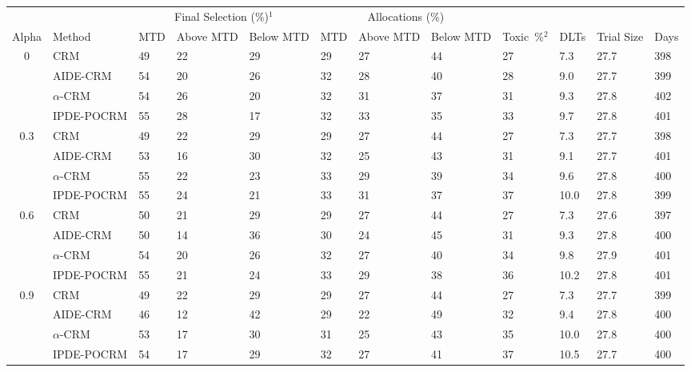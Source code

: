 \begin{tabular*}{\textwidth}{@{\extracolsep\fill}clllllllllll@{\extracolsep\fill}}
\toprule
&  & \multicolumn{3}{c}{Final Selection (\%)$^1$} & \multicolumn{3}{c}{Allocations (\%)} & &  &  &  \\
\multirow{2}{2em}{Alpha} & \multirow{2}{2em}{Method} & \multirow{2}{2em}{MTD} & \multirow{2}{2em}{Above MTD} & \multirow{2}{2em}{Below MTD} & \multirow{2}{2em}{MTD} & \multirow{2}{2em}{Above MTD} & \multirow{2}{2em}{Below MTD} & \multirow{2}{2em}{Toxic~\%$^2$} & \multirow{2}{2em}{DLTs} & \multirow{2}{2em}{Trial Size} & \multirow{2}{2em}{Days}  \\ \\ 
\midrule
\multirow{4}{2em}{0} & CRM & 49 & 22 & 29 & 29 & 27 & 44 & 27 & 7.3 & 27.7 & 398\\
 & AIDE-CRM & 54 & 20 & 26 & 32 & 28 & 40 & 28 & 9.0 & 27.7 & 399\\
 & $\alpha$-CRM & 54 & 26 & 20 & 32 & 31 & 37 & 31 & 9.3 & 27.8 & 402\\
 & IPDE-POCRM & 55 & 28 & 17 & 32 & 33 & 35 & 33 & 9.7 & 27.8 & 401\\
\midrule
\multirow{4}{2em}{0.3} & CRM & 49 & 22 & 29 & 29 & 27 & 44 & 27 & 7.3 & 27.7 & 398\\
 & AIDE-CRM & 53 & 16 & 30 & 32 & 25 & 43 & 31 & 9.1 & 27.7 & 401\\
 & $\alpha$-CRM & 55 & 22 & 23 & 33 & 29 & 39 & 34 & 9.6 & 27.8 & 400\\
 & IPDE-POCRM & 55 & 24 & 21 & 33 & 31 & 37 & 37 & 10.0 & 27.8 & 399\\
\midrule
\multirow{4}{2em}{0.6} & CRM & 50 & 21 & 29 & 29 & 27 & 44 & 27 & 7.3 & 27.6 & 397\\
 & AIDE-CRM & 50 & 14 & 36 & 30 & 24 & 45 & 31 & 9.3 & 27.8 & 400\\
 & $\alpha$-CRM & 54 & 20 & 26 & 32 & 27 & 40 & 34 & 9.8 & 27.9 & 401\\
 & IPDE-POCRM & 55 & 21 & 24 & 33 & 29 & 38 & 36 & 10.2 & 27.8 & 401\\
\midrule
\multirow{4}{2em}{0.9} & CRM & 49 & 22 & 29 & 29 & 27 & 44 & 27 & 7.3 & 27.7 & 399\\
 & AIDE-CRM & 46 & 12 & 42 & 29 & 22 & 49 & 32 & 9.4 & 27.8 & 400\\
 & $\alpha$-CRM & 53 & 17 & 30 & 31 & 25 & 43 & 35 & 10.0 & 27.8 & 400\\
 & IPDE-POCRM & 54 & 17 & 29 & 32 & 27 & 41 & 37 & 10.5 & 27.7 & 400\\
\bottomrule
\end{tabular*}
